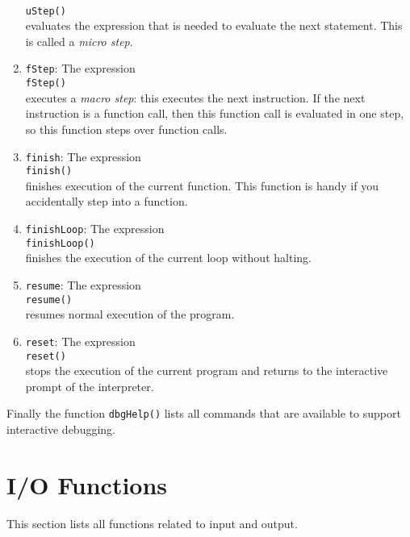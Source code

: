 \begin{enumerate}
      \\[0.2cm]
      \hspace*{1.3cm}
      \texttt{uStep()}
      \\[0.2cm]
      evaluates the expression that is needed to evaluate the next statement.
      This is called a \emph{micro step}.
\item \texttt{fStep}: The expression
      \\[0.2cm]
      \hspace*{1.3cm}
      \texttt{fStep()}
      \\[0.2cm]
      executes a \emph{macro step}: this executes the next instruction.  If the next
      instruction is a function call, then this function call is evaluated in one step,
      so this function steps over function calls.
\item \texttt{finish}:  The expression
      \\[0.2cm]
      \hspace*{1.3cm}
      \texttt{finish()}
      \\[0.2cm]
      finishes execution of the current function.  This function is handy if you
      accidentally step into a function.
\item \texttt{finishLoop}:  The expression
      \\[0.2cm]
      \hspace*{1.3cm}
      \texttt{finishLoop()}
      \\[0.2cm]
      finishes the execution of the current loop without halting.
\item \texttt{resume}: The expression
      \\[0.2cm]
      \hspace*{1.3cm}
      \texttt{resume()}
      \\[0.2cm]
      resumes normal execution of the program.
\item \texttt{reset}: The expression
      \\[0.2cm]
      \hspace*{1.3cm}
      \texttt{reset()}
      \\[0.2cm]
      stops the execution of the current program and returns to the interactive prompt of
      the interpreter.
\end{enumerate}
Finally the function \texttt{dbgHelp()} lists all commands that are available to support
interactive debugging.


\section{I/O Functions}
This  section lists all functions related to input and output.

